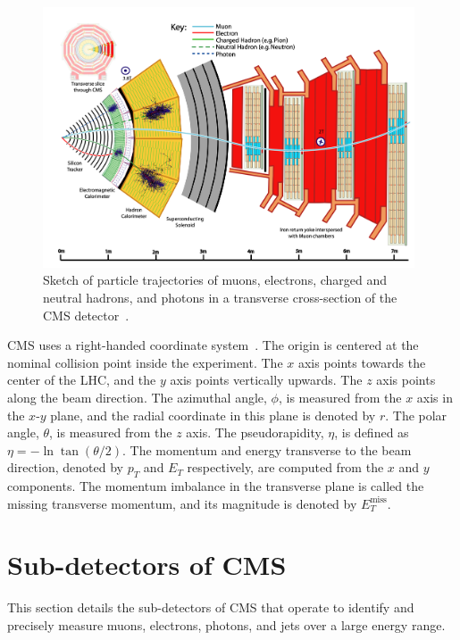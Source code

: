 \begin{figure}[ht]
    \centering
    \includegraphics[width=11cm]{figures/ch-2-cern-cms/sketch-cms-particle-interactions.png}
    \caption[Sketch of particle trajectories of muons, electrons, charged and neutral hadrons, and photons in a transverse cross-section of the CMS detector.]{Sketch of particle trajectories of muons, electrons, charged and neutral hadrons, and photons in a transverse cross-section of the CMS detector~\cite{CERN-EP-2017-110}.}
    \label{fig:sketch-cms-particle-interactions}
\end{figure}

CMS uses a right-handed coordinate system~\cite{CMS-2008-JINST-3-S08004}. The origin is centered at the nominal collision point inside the experiment. The $x$ axis points towards the center of the LHC, and the $y$ axis points vertically upwards. The $z$ axis points along the beam direction. The azimuthal angle, $\phi$, is measured from the $x$ axis in the $x$-$y$ plane, and the radial coordinate in this plane is denoted by $r$. The polar angle, $\theta$, is measured from the $z$ axis. The pseudorapidity, $\eta$, is defined as $\eta = -\ln \tan(\theta/2)$. The momentum and energy transverse to the beam direction, denoted by $p_{T}$ and $E_{T}$ respectively, are computed from the $x$ and $y$ components. The momentum imbalance in the transverse plane is called the missing transverse momentum, and its magnitude is denoted by $E_{T}^{\text{miss}}$.

\section{Sub-detectors of CMS}
This section details the sub-detectors of CMS that operate to identify and precisely measure muons, electrons, photons, and jets over a large energy range. 

